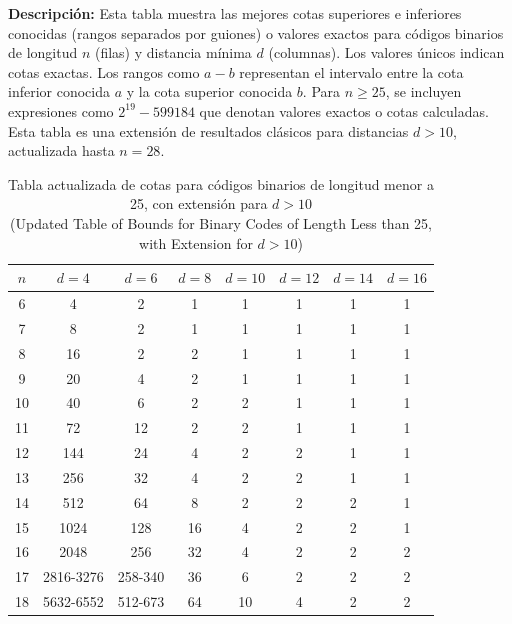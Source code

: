\begin{table}[H]
\centering
\caption[Tabla de cotas para códigos binarios]{Tabla actualizada de cotas para códigos binarios de longitud menor a 25, con extensión para $d > 10$ \\ \small (Updated Table of Bounds for Binary Codes of Length Less than 25, with Extension for $d > 10$)}
\label{tab:binary_bounds}
\smallskip
\parbox{0.9\linewidth}{\small \textbf{Descripción:} Esta tabla muestra las mejores cotas superiores e inferiores conocidas (rangos separados por guiones) o valores exactos para códigos binarios de longitud $n$ (filas) y distancia mínima $d$ (columnas). Los valores únicos indican cotas exactas. Los rangos como $a-b$ representan el intervalo entre la cota inferior conocida $a$ y la cota superior conocida $b$. Para $n \geq 25$, se incluyen expresiones como $2^{19}-599184$ que denotan valores exactos o cotas calculadas. Esta tabla es una extensión de resultados clásicos para distancias $d>10$, actualizada hasta $n=28$.}
\medskip
\begin{tabular}{c c c c c c c c}
\toprule
$n$ & $d=4$ & $d=6$ & $d=8$ & $d=10$ & $d=12$ & $d=14$ & $d=16$ \\
\midrule
6  & 4            & 2            & 1    & 1    & 1    & 1    & 1 \\
7  & 8            & 2            & 1    & 1    & 1    & 1    & 1 \\
8  & 16           & 2            & 2    & 1    & 1    & 1    & 1 \\
9  & 20           & 4            & 2    & 1    & 1    & 1    & 1 \\
10 & 40           & 6            & 2    & 2    & 1    & 1    & 1 \\
11 & 72           & 12           & 2    & 2    & 1    & 1    & 1 \\
12 & 144          & 24           & 4    & 2    & 2    & 1    & 1 \\
13 & 256          & 32           & 4    & 2    & 2    & 1    & 1 \\
14 & 512          & 64           & 8    & 2    & 2    & 2    & 1 \\
15 & 1024         & 128          & 16   & 4    & 2    & 2    & 1 \\
16 & 2048         & 256          & 32   & 4    & 2    & 2    & 2 \\
17 & 2816-3276    & 258-340      & 36   & 6    & 2    & 2    & 2 \\
18 & 5632-6552    & 512-673      & 64   & 10   & 4    & 2    & 2 \\

\end{tabular}
\end{table}
